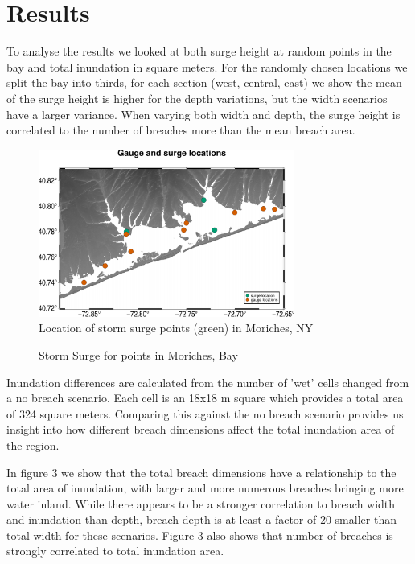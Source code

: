 \documentclass{coastal_paper}
\begin{document}
\section{Results}
To analyse the results we looked at both surge height at random points in the bay and total inundation in square meters. For the randomly chosen locations we split the bay into thirds, for each section (west, central, east) we show  the mean of the surge height is higher for the depth variations, but the width scenarios have a larger variance. When varying both width and depth, the surge height is correlated to the number of breaches more than the mean breach area.

\begin{figure}
    \centering
    \includegraphics[width=0.75\textwidth]{images/dot_map.pdf}
    \caption{Location of storm surge points (green) in Moriches, NY}
    \label{fig1}
\end{figure}

\begin{figure}[ht]
\centering

\caption{Storm Surge for points in Moriches, Bay}
\label{fig2}
\end{figure}

Inundation differences are calculated from the number of 'wet' cells changed from a no breach scenario. Each cell is an 18x18 m square which provides a total area of 324 square meters. Comparing this against the no breach scenario provides us insight into how different breach dimensions affect the total inundation area of the region.

In figure 3 we show that the total breach dimensions have a relationship to the total area of inundation, with larger and more numerous breaches bringing more water inland. While there appears to be a stronger correlation to breach width and inundation than depth, breach depth is at least a factor of 20 smaller than total width for these scenarios.
Figure 3 also shows that number of breaches is strongly correlated to total inundation area. 
\end{document}
